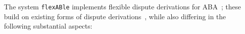 \documentclass[conference]{IEEEtran}
\newcommand{\flexable}{\texttt{flexABle}\xspace}
\begin{document}


The system \flexable implements flexible dispute derivations for ABA~\cite{DillerGG21}; these build on existing forms of dispute derivations~\cite{Toni13,CravenT16}, while also differing in the following substantial aspects:
\end{document}
